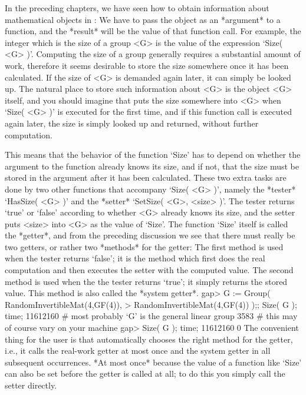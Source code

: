 

In the preceding chapters,  we have seen  how to obtain information about
mathematical  objects   in {\GAP}: We   have  to pass  the   object as an
*argument* to  a function, and the   *result* will be  the value  of that
function call. For example, the integer which is  the size of a group <G>
is  the value of the  expression `Size( <G> )'.   Computing the size of a
group generally requires a substantial amount of work, therefore it seems
desirable to store the size somewhere once it has been calculated. If the
size  of <G> is demanded   again later, it can  simply  be looked up. The
natural place  to  store such information  about  <G>  is the object  <G>
itself, and  you should imagine that  {\GAP} puts the size somewhere into
<G> when `Size( <G>   )' is executed  for the  first  time, and   if this
function call is executed  again later, the size is  simply looked up and
returned, without further computation.

%
%
This means  that  the behavior of the   function `Size' has  to depend on
whether the argument to the function already knows  its size, and if not,
that the  size   must be  stored  in  the  argument   after it  has  been
calculated. These two extra  tasks are done by  two other  functions that
accompany  `Size( <G> )',  namely the *tester*  `HasSize( <G>  )' and the
*setter*  `SetSize( <G>, <size> )'. The  tester returns `true' or `false'
according to  whether <G>  already knows its  size, and  the  setter puts
<size>  into <G> as the  value of `Size'. The   function `Size' itself is
called the *getter*, and from the preceding discussion  we see that there
must really be two  getters, or rather two *methods*  for the getter: The
first  method is used when  the tester returns  `false'; it is the method
which first does  the real computation and then  executes the setter with
the computed value. The second method is used when the the tester returns
`true'; it simply  returns the stored value.  This method is also  called
the *system getter*.
\beginexample
    gap> G := Group( RandomInvertibleMat(4,GF(4)),
    >                RandomInvertibleMat(4,GF(4)) );; Size( G ); time;
    11612160  # most probably `G' is the general linear group
    3583      # this may of course vary on your machine
    gap> Size( G ); time;
    11612160
    0
\endexample
The convenient thing  for the user  is that  {\GAP} automatically chooses
the right method for the  getter, i.e., it  calls the real-work getter at
most once and  the system getter in  all subsequent occurrences. *At most
once* because the value of a function like  `Size' can also be set before
the getter  is called  at  all; to do  this  you simply call  the  setter
directly.


